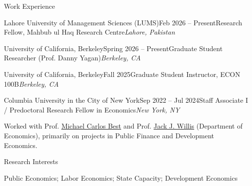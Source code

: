 \documentclass{../resume}
\begin{document}
\begin{rSection}{Work Experience}

\begin{rSubsection}{Lahore University of Management Sciences (LUMS)}{Feb 2026 -- Present}{Research Fellow, Mahbub ul Haq Research Centre}{\em Lahore, Pakistan}
\item[]
\vspace{-1.1em}
\end{rSubsection}

\begin{rSubsection}{University of California, Berkeley}{Spring 2026 -- Present}{Graduate Student Researcher (Prof. Danny Yagan)}{\em Berkeley, CA}
\item[]
\vspace{-1.1em}
\end{rSubsection}

\begin{rSubsection}{University of California, Berkeley}{Fall 2025}{Graduate Student Instructor, ECON 100B}{\em Berkeley, CA}
\item[]
\vspace{-1.1em}
\end{rSubsection}

\begin{rSubsection}{Columbia University in the City of New York}{Sep 2022 -- Jul 2024}{Staff Associate I / Predoctoral Research Fellow in Economics}{\em New York, NY}
\item[]
\vspace{-.5cm}
\item Worked with Prof. \href{https://blogs.cuit.columbia.edu/mcb2270/}{Michael Carlos Best} and Prof. \href{https://sites.google.com/view/jwillis/}{Jack J. Willis} (Department of Economics), primarily on projects in Public Finance and Development Economics.
\vspace{-0.4cm}
\end{rSubsection}

\end{rSection}

\begin{rSection}{Research Interests}
\vspace{-0.5cm}
\item Public Economics; Labor Economics; State Capacity; Development Economics
\end{rSection}
\end{document}
